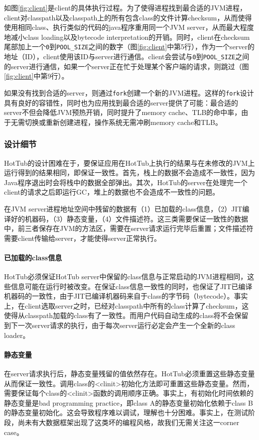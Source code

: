 \documentclass[lang=cn,12pt,a4paper,cite=authoryear]{elegantpaper}
\begin{document}
\begin{figure*}[!htp]
如图\ref{fig:client}是client的具体执行过程。为了使得进程找到最合适的JVM进程，client对classpath以及classpath上的所有包含class的文件计算checksum，从而使得使用相同class、执行类似的代码的java程序重用同一个JVM server，从而最大程度地减小class loading以及bytecode interpretation的开销。同时，client在checksum尾部加上一个\texttt{0}到\texttt{POOL\_SIZE}之间的数字（图\ref{fig:client}中第5行），作为一个server的地址（ID），client使用该ID与server进行通信。client会尝试与\texttt{0}到\texttt{POOL\_SIZE}之间的server进行通信，如果一个server正在忙于处理某个客户端的请求，则跳过（图\ref{fig:client}中第9行）。

如果没有找到合适的server，则通过\texttt{fork}创建一个新的JVM进程。这样的\texttt{fork}设计具有良好的容错性，同时也为应用找到最合适的server提供了可能：最合适的server不但会降低JVM预热开销，同时提升了memory cache、TLB的命中率，由于无需切换或重新创建进程，操作系统无需冲刷memory cache和TLB。

\subsubsection{设计细节}
HotTub的设计困难在于，要保证应用在HotTub上执行的结果与在未修改的JVM上运行得到的结果相同，即保证一致性。首先，栈上的数据不会造成不一致性，因为Java程序退出时会将栈中的数据全部弹出。其次，HotTub的server在处理完一个client的请求之后即运行GC，堆上的数据也不会造成不一致性的问题。

在JVM server进程地址空间中残留的数据有（1）已加载的class信息，（2）JIT编译好的机器码，（3）静态变量，（4）文件描述符。这三类需要保证一致性的数据中，前三者保存在JVM的方法区，需要在server请求运行完毕后重置；文件描述符需要client传输给server，才能使得server正常执行。

\paragraph{已加载的class信息}
HotTub必须保证HotTub server中保留的class信息与正常启动的JVM进程相同，这些信息可能在运行时被改变。在保证class信息一致性的同时，也保证了JIT已编译机器码的一致性，由于JIT已编译机器码来自于class的字节码（bytecode）。事实上，在client选取server之时，已经对classpath中所有的class计算了checksum，这使得从classpath加载的class有了一致性。而用户代码自动生成的class将不会保留到下一次server请求的执行，由于每次server运行必定会产生一个全新的class loader。

\paragraph{静态变量}
在server请求执行后，静态变量残留的值依然存在。HotTub必须重置这些静态变量从而保证一致性。调用class的<clinit>初始化方法即可重置这些静态变量。然而，需要保证每个class的<clinit>函数的调用顺序正确。事实上，有初始化时间依赖的静态变量是bad programming practice，即class A的静态变量初始化依赖于class B的静态变量初始化。这会导致程序难以调试，理解也十分困难。事实上，在测试阶段，尚未有大数据框架出现了这类坏的编程风格，故我们无需关注这一corner case。


\end{figure*}
\end{document}
